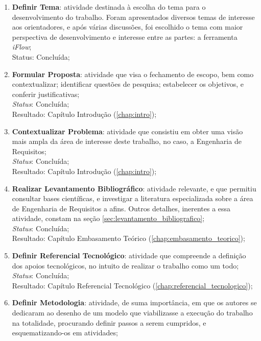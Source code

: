 \begin{enumerate}
    \item \textbf{Definir Tema}: atividade destinada à escolha do tema para o desenvolvimento do trabalho. Foram apresentados diversos temas de interesse aos orientadores, e após várias discussões, foi escolhido o tema com maior perspectiva de desenvolvimento e interesse entre as partes: a ferramenta \textit{iFlow};
    \\
    Status: Concluída;
    \item \label{item:proposta} \textbf{Formular Proposta}: atividade que visa o fechamento de escopo, bem como contextualizar; identificar questões de pesquisa; estabelecer os objetivos, e conferir justificativas;
    \\
    \textit{Status}: Concluída;
    \\
    Resultado: Capítulo Introdução (\ref{chap:intro});
    \item \textbf{Contextualizar Problema}: atividade que consistiu em obter uma visão mais ampla da área de interesse deste trabalho, no caso, a Engenharia de Requisitos;
    \\
    \textit{Status}: Concluída;
    \\
    Resultado: Capítulo Introdução (\ref{chap:intro});
    \item \textbf{Realizar Levantamento Bibliográfico}: atividade relevante, e que permitiu consultar bases científicas, e investigar a literatura especializada sobre a área de Engenharia de Requisitos a afins. Outros detalhes, inerentes a essa atividade, constam na seção \ref{sec:levantamento_bibliografico};
    \\
    \textit{Status}: Concluída;
    \\
    Resultado: Capítulo Embasamento Teórico (\ref{chap:embasamento_teorico});
    \item \textbf{Definir Referencial Tecnológico}: atividade que compreende a definição dos apoios tecnológicos, no intuito de realizar o trabalho como um todo;
    \\
    \textit{Status}: Concluída;
    \\
    Resultado: Capítulo Referencial Tecnológico (\ref{chap:referencial_tecnologico});
    \item \textbf{Definir Metodologia}: atividade, de suma importância, em que os autores se dedicaram ao desenho de um modelo que viabilizasse a execução do trabalho na totalidade, procurando definir passos a serem cumpridos, e esquematizando-os em atividades;
    \\

\end{enumerate}

